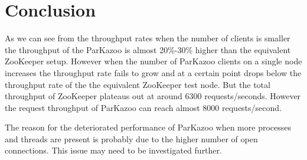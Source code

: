 \section{Conclusion}
As we can see from the throughput rates when the number of clients is smaller the throughput of the ParKazoo is almost 20\%-30\% higher than the equivalent ZooKeeper setup. However when the number of ParKazoo clients on a single node increases the throughput rate fails to grow and at a certain point drops below the throughput rate of the the equivalent ZooKeeper test node. But the total throughput of ZooKeeper plateaus out at around 6300 requests/seconds. However the request throughput of ParKazoo can reach almost 8000 requests/second.

The reason for the deteriorated performance of ParKazoo when more processes and threads are present is probably due to the higher number of open connections. This issue may need to be investigated further. 
